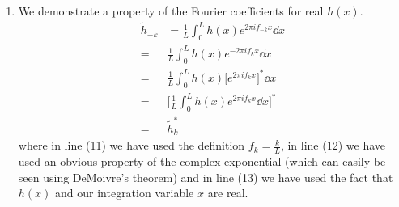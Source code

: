 \documentclass[11pt]{article}
\begin{document}
\begin{enumerate}
	\item We demonstrate a property of the Fourier coefficients for real $h(x)$.
	\begin{align}
		\tilde h_{-k} &= \frac{1}{L} \int_0^L h(x) e^{2 \pi i f_{-k} x} \dd{x} \\
		=& \frac{1}{L} \int_0^L h(x) e^{-2 \pi i f_{k} x} \dd{x} \\
		=& \frac{1}{L} \int_0^L h(x) \big[ e^{2 \pi i f_{k} x} \big]^{*} \dd{x} \\
		=& \bigg[ \frac{1}{L} \int_0^L h(x) e^{2 \pi i f_{k} x} \dd{x} \bigg]^{*} \\
		=& \tilde h_k^*
	\end{align}
	where in line (11) we have used the definition $f_k = \frac{k}{L}$, in line (12) we have used an obvious property of the complex exponential (which can easily be seen using DeMoivre's theorem) and in line (13) we have used the fact that $h(x)$ and our integration variable $x$ are real.
	

\end{enumerate}
\end{document}

